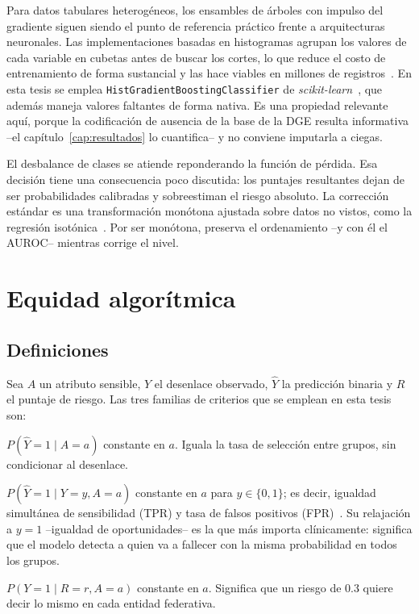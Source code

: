 Para datos tabulares heterogéneos, los ensambles de árboles con impulso del
gradiente siguen siendo el punto de referencia práctico frente a arquitecturas
neuronales. Las implementaciones basadas en histogramas agrupan los valores de
cada variable en cubetas antes de buscar los cortes, lo que reduce el costo de
entrenamiento de forma sustancial y las hace viables en millones de
registros~\parencite{lightgbm2017}. En esta tesis se emplea
\texttt{HistGradientBoostingClassifier} de \emph{scikit-learn}~\parencite{sklearn2011},
que además maneja valores faltantes de forma nativa. Es una propiedad relevante
aquí, porque la codificación de ausencia de la base de la DGE resulta informativa
--el capítulo~\ref{cap:resultados} lo cuantifica-- y no conviene imputarla a
ciegas.

El desbalance de clases se atiende reponderando la función de pérdida. Esa
decisión tiene una consecuencia poco discutida: los puntajes resultantes dejan de
ser probabilidades calibradas y sobreestiman el riesgo absoluto. La corrección
estándar es una transformación monótona ajustada sobre datos no vistos, como la
regresión isotónica~\parencite{zadrozny2002}. Por ser monótona, preserva el
ordenamiento --y con él el AUROC-- mientras corrige el nivel.

\section{Equidad algorítmica}

\subsection{Definiciones}

Sea $A$ un atributo sensible, $Y$ el desenlace observado, $\hat{Y}$ la predicción
binaria y $R$ el puntaje de riesgo. Las tres familias de criterios que se emplean
en esta tesis son:

\begin{description}[leftmargin=*,style=nextline]
  \item[Paridad demográfica (independencia)]
    $P(\hat{Y}=1 \mid A=a)$ constante en $a$. Iguala la tasa de selección entre
    grupos, sin condicionar al desenlace.
  \item[\emph{Equalized odds} (separación)]
    $P(\hat{Y}=1 \mid Y=y, A=a)$ constante en $a$ para $y\in\{0,1\}$; es decir,
    igualdad simultánea de sensibilidad (TPR) y tasa de falsos positivos
    (FPR)~\parencite{hardt2016}. Su relajación a $y=1$ --igualdad de
    oportunidades-- es la que más importa clínicamente: significa que el modelo
    detecta a quien va a fallecer con la misma probabilidad en todos los grupos.
  \item[Calibración por grupo (suficiencia)]
    $P(Y=1 \mid R=r, A=a)$ constante en $a$. Significa que un riesgo de 0.3
    quiere decir lo mismo en cada entidad federativa.
\end{description}

